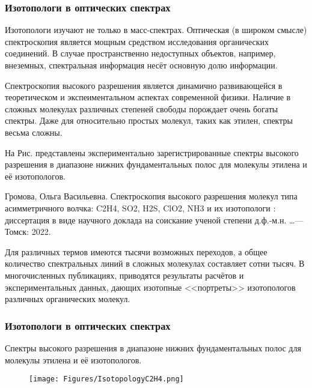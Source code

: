 \begin{frame}
\frametitle{Изотопологи в оптических спектрах}

{\footnotesize
Изотопологи изучают не только в масс-спектрах. Оптическая (в широком смысле) спектроскопия является мощным средством исследования органических соединений. В случае пространственно недоступных объектов, например, внеземных, спектральная информация несёт основную долю информации.

Спектроскопия высокого разрешения является динамично развивающейся в теоретическом и экспеиментальном аспектах современной физики. Наличие в сложных молекулах различных степеней свободы порождает очень богаты спектры. Даже для относительно простых молекул, таких как этилен,
спектры весьма сложны.

На Рис. представлены экспериментально зарегистрированные спектры высокого разрешения в диапазоне нижних фундаментальных полос для молекулы этилена и её изотопологов.

Громова, Ольга Васильевна. Спектроскопия высокого разрешения молекул типа асимметричного волчка: C2H4, SO2, H2S, ClO2, NH3 и их изотопологи : диссертация в виде научного доклада на соискание ученой степени д.ф.-м.н. \ldots — Томск: 2022.

Для различных термов имеются тысячи возможных переходов, а общее количество спектральных линий в сложных молекулах составляет сотни тысяч. В многочисленных публикациях, приводятся результаты расчётов и экспериментальных данных, дающих изотопные
<<портреты>> изотопологов различных органических молекул.}
\end{frame}

\begin{frame}
\frametitle{Изотопологи в оптических спектрах}

Спектры высокого разрешения в диапазоне нижних фундаментальных полос для молекулы этилена и её изотопологов.

\begin{figure}[ht] 
	\centering\small
	\texttt{[image: Figures/IsotopologyC2H4.png]}
\end{figure}

\end{frame}


